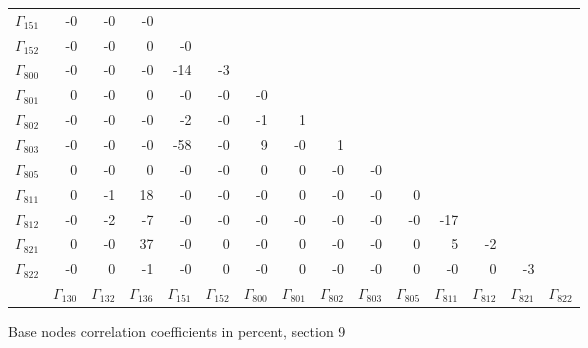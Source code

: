 {\begin{table}
\begin{center}
\begin{minipage}{\linewidth}
\begin{center}
\begin{envsmall}
\begin{center}
\begin{tabular}{rrrrrrrrrrrrrrr}
\( \Gamma_{151} \) &   -0 &   -0 &   -0 &  &  &  &  &  &  &  &  &  &  &  \\
\( \Gamma_{152} \) &   -0 &   -0 &    0 &   -0 &  &  &  &  &  &  &  &  &  &  \\
\( \Gamma_{800} \) &   -0 &   -0 &   -0 &  -14 &   -3 &  &  &  &  &  &  &  &  &  \\
\( \Gamma_{801} \) &    0 &   -0 &    0 &   -0 &   -0 &   -0 &  &  &  &  &  &  &  &  \\
\( \Gamma_{802} \) &   -0 &   -0 &   -0 &   -2 &   -0 &   -1 &    1 &  &  &  &  &  &  &  \\
\( \Gamma_{803} \) &   -0 &   -0 &   -0 &  -58 &   -0 &    9 &   -0 &    1 &  &  &  &  &  &  \\
\( \Gamma_{805} \) &    0 &   -0 &    0 &   -0 &   -0 &    0 &    0 &   -0 &   -0 &  &  &  &  &  \\
\( \Gamma_{811} \) &    0 &   -1 &   18 &   -0 &   -0 &   -0 &    0 &   -0 &   -0 &    0 &  &  &  &  \\
\( \Gamma_{812} \) &   -0 &   -2 &   -7 &   -0 &   -0 &   -0 &   -0 &   -0 &   -0 &   -0 &  -17 &  &  &  \\
\( \Gamma_{821} \) &    0 &   -0 &   37 &   -0 &    0 &   -0 &    0 &   -0 &   -0 &    0 &    5 &   -2 &  &  \\
\( \Gamma_{822} \) &   -0 &    0 &   -1 &   -0 &    0 &   -0 &    0 &   -0 &   -0 &    0 &   -0 &    0 &   -3 &  \\
 & \( \Gamma_{130} \) & \( \Gamma_{132} \) & \( \Gamma_{136} \) & \( \Gamma_{151} \) & \( \Gamma_{152} \) & \( \Gamma_{800} \) & \( \Gamma_{801} \) & \( \Gamma_{802} \) & \( \Gamma_{803} \) & \( \Gamma_{805} \) & \( \Gamma_{811} \) & \( \Gamma_{812} \) & \( \Gamma_{821} \) & \( \Gamma_{822} \)
\\\hline
\end{tabular}
\end{center}
\end{envsmall}
\ifhevea\else
\end{center}
\end{minipage}
\fi
\end{center}
\ifhevea\end{table}\fi
\ifhevea\begin{table}\fi%
\begin{center}
\ifhevea
\caption{Base nodes correlation coefficients in percent, section 9\label{tab:tau:br-fit-corr9}}%
\else
\begin{minipage}{\linewidth}

\end{minipage}
\end{center}
\end{table}}
